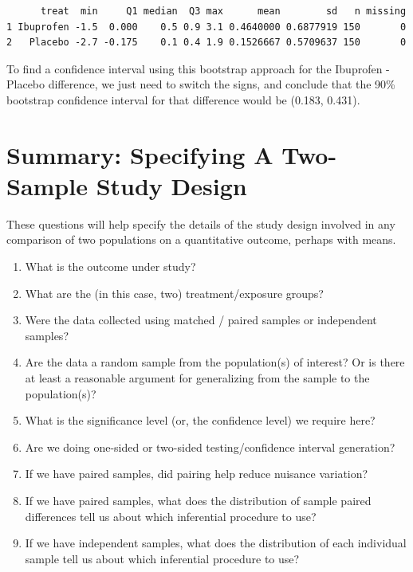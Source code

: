 \documentclass[
]{book}
\providecommand{\tightlist}{%
  \setlength{\itemsep}{0pt}\setlength{\parskip}{0pt}}
\begin{document}
\begin{verbatim}
      treat  min     Q1 median  Q3 max      mean        sd   n missing
1 Ibuprofen -1.5  0.000    0.5 0.9 3.1 0.4640000 0.6877919 150       0
2   Placebo -2.7 -0.175    0.1 0.4 1.9 0.1526667 0.5709637 150       0
\end{verbatim}

To find a confidence interval using this bootstrap approach for the Ibuprofen - Placebo difference, we just need to switch the signs, and conclude that the 90\% bootstrap confidence interval for that difference would be (0.183, 0.431).

\hypertarget{summary-specifying-a-two-sample-study-design}{%
\section{Summary: Specifying A Two-Sample Study Design}\label{summary-specifying-a-two-sample-study-design}}

These questions will help specify the details of the study design involved in any comparison of two populations on a quantitative outcome, perhaps with means.

\begin{enumerate}
\def\labelenumi{\arabic{enumi}.}
\tightlist
\item
  What is the outcome under study?
\item
  What are the (in this case, two) treatment/exposure groups?
\item
  Were the data collected using matched / paired samples or independent samples?
\item
  Are the data a random sample from the population(s) of interest? Or is there at least a reasonable argument for generalizing from the sample to the population(s)?
\item
  What is the significance level (or, the confidence level) we require here?
\item
  Are we doing one-sided or two-sided testing/confidence interval generation?
\item
  If we have paired samples, did pairing help reduce nuisance variation?
\item
  If we have paired samples, what does the distribution of sample paired differences tell us about which inferential procedure to use?
\item
  If we have independent samples, what does the distribution of each individual sample tell us about which inferential procedure to use?
\end{enumerate}
\end{document}

